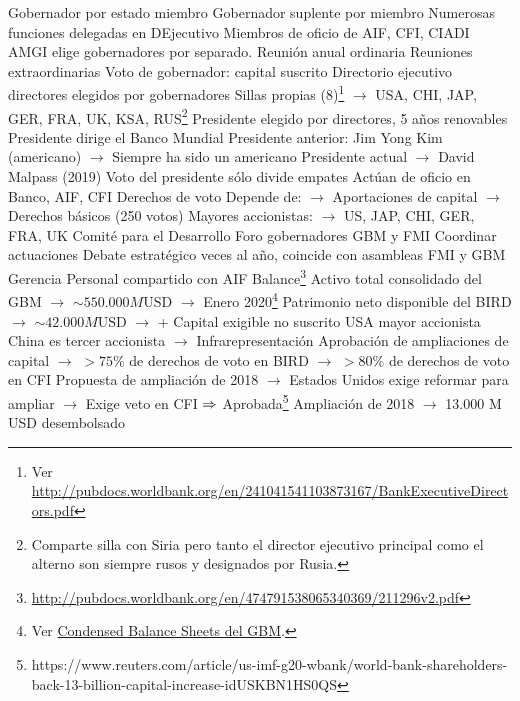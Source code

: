 \documentclass{nuevotema}
\begin{document}
\begin{esquemal}
				\4[] Gobernador por estado miembro
				\4[] Gobernador suplente por miembro
				\4[] Numerosas funciones delegadas en DEjecutivo
				\4[] Miembros de oficio de AIF, CFI, CIADI
				\4[] AMGI elige gobernadores por separado.
				\4[] Reunión anual ordinaria
				\4[] Reuniones extraordinarias
				\4[] Voto de gobernador: capital suscrito
				\4 Directorio ejecutivo
				 directores elegidos por gobernadores
				\4[] Sillas propias (8)\footnote{Ver \url{http://pubdocs.worldbank.org/en/241041541103873167/BankExecutiveDirectors.pdf}}
				\4[] $\to$ USA, CHI, JAP, GER, FRA, UK, KSA, RUS\footnote{Comparte silla con Siria pero tanto el director ejecutivo principal como el alterno son siempre rusos y designados por Rusia.}
				\4[] Presidente elegido por directores, 5 años renovables
				\4[] Presidente dirige el Banco Mundial
				\4[] Presidente anterior: Jim Yong Kim (americano)
				\4[] $\to$ Siempre ha sido un americano
				\4[] Presidente actual
				\4[] $\to$ David Malpass (2019)
				\4[] Voto del presidente sólo divide empates
				\4[] Actúan de oficio en Banco, AIF, CFI
				\4 Derechos de voto
				\4[] Depende de:
				\4[] $\to$ Aportaciones de capital
				\4[] $\to$ Derechos básicos (250 votos)
				\4[] Mayores accionistas:
				\4[] $\to$ US, JAP, CHI, GER, FRA, UK
				\4 Comité para el Desarrollo
				\4[] Foro gobernadores GBM y FMI
				\4[] Coordinar actuaciones
				\4[] Debate estratégico
				 veces al año, coincide con asambleas FMI y GBM
				\4 Gerencia
				\4[] Personal compartido con AIF
				\4 Balance\footnote{\url{http://pubdocs.worldbank.org/en/474791538065340369/211296v2.pdf}}
				\4[] Activo total consolidado del GBM
				\4[] $\to$ $\sim 550.000 M \text{USD}$
				\4[] $\to$ Enero 2020\footnote{Ver \href{https://finances.worldbank.org/Financial-Reporting/Condensed-Balance-Sheets/54xn-mzza/data}{Condensed Balance Sheets del GBM}.}
				\4[] Patrimonio neto disponible del BIRD
				\4[] $\to$ $\sim42.000 M \text{USD}$
				\4[] $\to$ + Capital exigible no suscrito
				\4[] USA mayor accionista
				\4[] China es tercer accionista
				\4[] $\to$ Infrarepresentación
				\4[] Aprobación de ampliaciones de capital
				\4[] $\to$ $>75\%$ de derechos de voto en BIRD
				\4[] $\to$ $>80\%$ de derechos de voto en CFI
				\4[] Propuesta de ampliación de 2018
				\4[] $\to$ Estados Unidos exige reformar para ampliar
				\4[] $\to$ Exige veto en CFI
				\4[] $\Rightarrow$ Aprobada\footnote{https://www.reuters.com/article/us-imf-g20-wbank/world-bank-shareholders-back-13-billion-capital-increase-idUSKBN1HS0QS}
				\4[] Ampliación de 2018
				\4[] $\to$ 13.000 M USD desembolsado

\end{esquemal}
\end{document}
